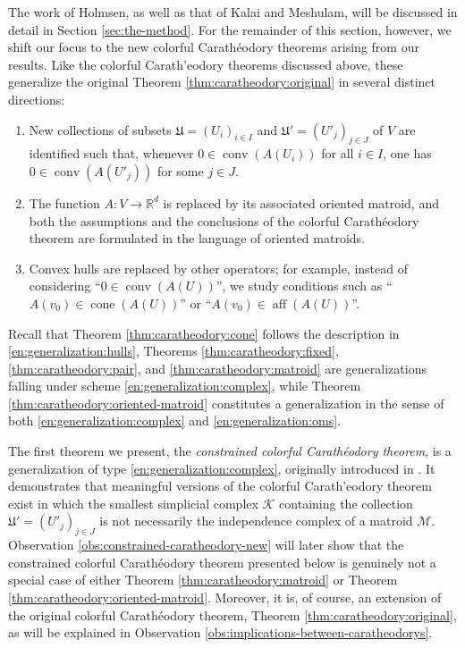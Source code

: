 \documentclass[a4paper,11pt,reqno, english]{amsart}
\theoremstyle{definition}
\theoremstyle{remark}
\newcommand\R{\mathbb R}
\DeclareMathOperator{\cone}{\mathrm{cone}}
\DeclareMathOperator{\conv}{\mathrm{conv}}
\begin{document}
\medskip
The work of Holmsen, as well as that of Kalai and Meshulam, will be discussed in detail in Section \ref{sec:the-method}. 
For the remainder of this section, however, we shift our focus to the new colorful Carath\'eodory theorems arising from our results. 
Like the colorful Carath'eodory theorems discussed above, these generalize the original Theorem \ref{thm:caratheodory:original} in several distinct directions:
\begin{enumerate}[label=\normalfont{(\Alph*)}]
    \item\label{en:generalization:complex} New collections of subsets $\mathfrak{U}=(U_i)_{i\in I}$ and $\mathfrak{U}'=(U'_j)_{j\in J}$ of $V$ are identified such that, whenever $0\in\conv(A(U_i))$ for all $i\in I$, one has $0\in\conv(A(U'_j))$ for some $j\in J$.
    
    \item\label{en:generalization:oms} The function $A\colon V\to\R^d$ is replaced by its associated oriented matroid, and both the assumptions and the conclusions of the colorful Carath\'eodory theorem are formulated in the language of oriented matroids.
    
    \item\label{en:generalization:hulls} Convex hulls are replaced by other operators; for example, instead of considering ``$0\in\conv(A(U))$'', we study conditions such as ``$A(v_0)\in\cone(A(U))$'' or ``$A(v_0)\in\operatorname{aff}(A(U))$''.
\end{enumerate}
Recall that Theorem \ref{thm:caratheodory:cone} follows the description in \ref{en:generalization:hulls}, Theorems \ref{thm:caratheodory:fixed}, \ref{thm:caratheodory:pair}, and \ref{thm:caratheodory:matroid} are generalizations falling under scheme \ref{en:generalization:complex}, while Theorem \ref{thm:caratheodory:oriented-matroid} constitutes a generalization in the sense of both \ref{en:generalization:complex} and \ref{en:generalization:oms}. 

\medskip
The first theorem we present, the \emph{constrained colorful Carath\'eodory theorem}, is a generalization of type \ref{en:generalization:complex}, originally introduced in \cite[Thm.\,1.6]{Blagojevic2025}. 
It demonstrates that meaningful versions of the colorful Carath'eodory theorem exist in which the smallest simplicial complex $\mathscr{K}$ containing the collection $\mathfrak{U}'=(U'_j)_{j\in J}$ is not necessarily the independence complex of a matroid $\mathscr{M}$. 
Observation \ref{obs:constrained-caratheodory-new} will later show that the constrained colorful Carath\'eodory theorem presented below is genuinely not a special case of either Theorem \ref{thm:caratheodory:matroid} or Theorem \ref{thm:caratheodory:oriented-matroid}. 
Moreover, it is, of course, an extension of the original colorful Carath\'eodory theorem, Theorem \ref{thm:caratheodory:original}, as will be explained in Observation \ref{obs:implications-between-caratheodorys}.
\end{document}
